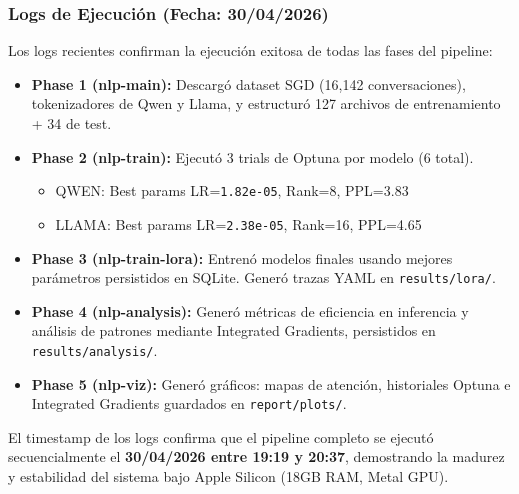 \subsubsection{Logs de Ejecución (Fecha: 30/04/2026)}

Los logs recientes confirman la ejecución exitosa de todas las fases del pipeline:

\begin{itemize}
    \item \textbf{Phase 1 (nlp-main):} Descargó dataset SGD (16,142 conversaciones), tokenizadores de Qwen y Llama, y estructuró 127 archivos de entrenamiento + 34 de test.
    \item \textbf{Phase 2 (nlp-train):} Ejecutó 3 trials de Optuna por modelo (6 total). 
    \begin{itemize}
        \item QWEN: Best params LR=\texttt{1.82e-05}, Rank=8, PPL=3.83
        \item LLAMA: Best params LR=\texttt{2.38e-05}, Rank=16, PPL=4.65
    \end{itemize}
    \item \textbf{Phase 3 (nlp-train-lora):} Entrenó modelos finales usando mejores parámetros persistidos en SQLite. Generó trazas YAML en \texttt{results/lora/}.
    \item \textbf{Phase 4 (nlp-analysis):} Generó métricas de eficiencia en inferencia y análisis de patrones mediante Integrated Gradients, persistidos en \texttt{results/analysis/}.
    \item \textbf{Phase 5 (nlp-viz):} Generó gráficos: mapas de atención, historiales Optuna e Integrated Gradients guardados en \texttt{report/plots/}.
\end{itemize}

El timestamp de los logs confirma que el pipeline completo se ejecutó secuencialmente el \textbf{30/04/2026 entre 19:19 y 20:37}, demostrando la madurez y estabilidad del sistema bajo Apple Silicon (18GB RAM, Metal GPU).
